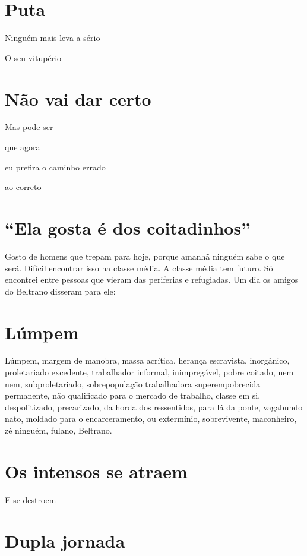 \chapter{Puta}

{\parindent0pt
Ninguém mais leva a sério

O seu vitupério
}

\chapter{Não vai dar certo}

{\parindent0pt
Mas pode ser

que agora

eu prefira o caminho errado

ao correto
}


\chapter{``Ela gosta é dos coitadinhos''}

Gosto de homens que trepam para hoje,
porque amanhã ninguém sabe o que será. Difícil encontrar isso na classe
média. A classe média tem futuro. Só encontrei entre pessoas que vieram
das periferias e refugiadas. Um dia os amigos do Beltrano disseram para
ele:

\chapter{Lúmpem}

Lúmpem, margem de manobra, massa acrítica, herança escravista,
inorgânico, proletariado excedente, trabalhador informal, inimpregável,
pobre coitado, nem nem, subproletariado, sobrepopulação trabalhadora
superempobrecida permanente, não qualificado para o mercado de trabalho,
classe em si, despolitizado, precarizado, da horda dos ressentidos, para
lá da ponte, vagabundo nato, moldado para o encarceramento, ou
extermínio, sobrevivente, maconheiro, zé ninguém, fulano, Beltrano.

\chapter{Os intensos se atraem}

E se destroem

\chapter{Dupla jornada}

